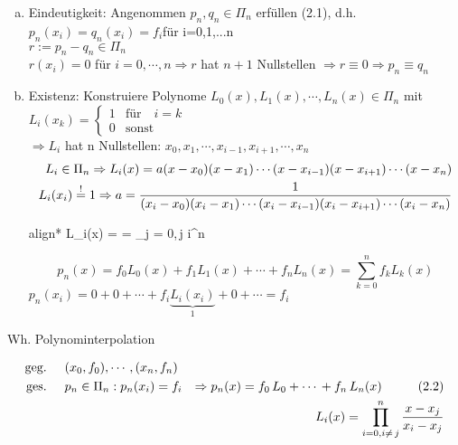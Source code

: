 \begin{enumerate}[(a)]
  \item Eindeutigkeit: Angenommen $p_n, q_n \in \Pi_n$ erfüllen (2.1), d.h. $p_n(x_i)=q_n(x_i)=f_i $für i=0,1,...n\\
    $r := p_n - q_n \in \Pi_n$ \\
    $r(x_i) = 0$ für $i = 0, \cdots, n \Rightarrow r$ hat $n + 1$ Nullstellen
    $\Rightarrow r \equiv 0 \Rightarrow p_n \equiv q_n$
  \item Existenz: Konstruiere Polynome $L_0(x), L_1(x), \cdots, L_n(x) \in \Pi_n$ mit\\
    $L_i(x_k)=\begin{cases} 1 & \mbox{für } \mbox{ $i = k$} \\ 
      0 & \mbox{sonst} \end{cases}$ \\
    $\Rightarrow L_i$ hat n Nullstellen: $x_0, x_1, \cdots, x_{i-1}, x_{i+1}, \cdots, x_n$
		\begin{align*}    
		L_i \in \Pi_n \Rightarrow L_i(x) = a(x-x_0)(x-x_1)\cdots(x-x_{i-1})(x-x_{i+1})\cdots(x-x_n)\\
    L_i(x_i) \overset{!}{=} 1 \Rightarrow
      a = \frac{1}{(x_i-x_0)(x_i-x_1)\cdots(x_i-x_{i-1})(x_i-x_{i+1})\cdots(x_i-x_n)}\\
    \end{align*}
		\begin{empheq}[innerbox=\fbox,right=\Leftarrow{\text{LAGRANGE-POLYNOME}}]{align*}
		\Rightarrow L_i(x) =  = 
      \prod\limits_{j = 0,\,j \neq i}^n  \\
		\end{empheq}
    \begin{equation*}
      \tag{2.2}
      p_n(x) = f_0 L_0(x) + f_1 L_1(x) + \cdots + f_n L_n(x) = 
      \sum\limits_{k = 0}^n f_k L_k(x)
    \end{equation*}
    $p_n(x_i) = 0 + 0 + \cdots + f_i\underbrace{L_i(x_i)}_{1} + 0 + \cdots = f_i$\\
\end{enumerate}

Wh. Polynominterpolation

\begin{align*}
\text{geg.} \hspace{0.5cm} & (x_0,f_0),\cdots\,,(x_n,f_n) \\
\text{ges.} \hspace{0.5cm} & p_n \in \Pi_n:p_n(x_i)=f_i & \Rightarrow p_n(x) = f_0\,L_0+\cdots\,+f_n\,L_n(x) \hspace{1cm} (2.2)\\
& & L_i(x)=\prod\limits_{i=0,i\neq\,j}^n \frac{x-x_j}{x_i-x_j}
\end{align*}

